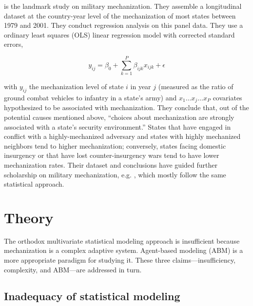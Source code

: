 \documentclass{article}
\begin{document}
\citet{sechser2010army} is the landmark study on military mechanization. They
assemble a longitudinal dataset at the country-year level of the mechanization
of most states between 1979 and 2001. They conduct regression analysis on this
panel data. They use a ordinary least squares (OLS) linear regression model with corrected standard
errors,

\begin{equation}
	y_{ij} = \beta_0 + \sum_{k=1}^P \beta_{ijk}x_{ijk} + \epsilon
\end{equation}

with $y_{ij}$ the mechanization level of state $i$ in year $j$ (measured as the 
ratio of ground combat vehicles to infantry in a state's army) and $x_1 \ldots
x_j \ldots x_{P}$ covariates hypothesized to be associated with
mechanization. They conclude that, out of the
potential causes mentioned above, ``choices about
mechanization are strongly associated with a state's security environment.''
States that have engaged in conflict with a highly-mechanized adversary and states
with highly mechanized neighbors tend to higher mechanization; conversely, states facing
domestic insurgency or that have lost counter-insurgency wars tend to have lower
mechanization rates. Their dataset and conclusions have guided further scholarship on military
mechanization, e.g. \citet{pilster2012democracies}, which mostly follow the same
statistical approach.

\section{Theory}

The orthodox multivariate statistical modeling approach is insufficient because
mechanization is a complex adaptive system. Agent-based modeling (ABM) is a more 
appropriate paradigm for studying it. These three
claims---insufficiency, complexity, and ABM---are addressed in turn. 

\subsection{Inadequacy of statistical modeling}
\end{document}
